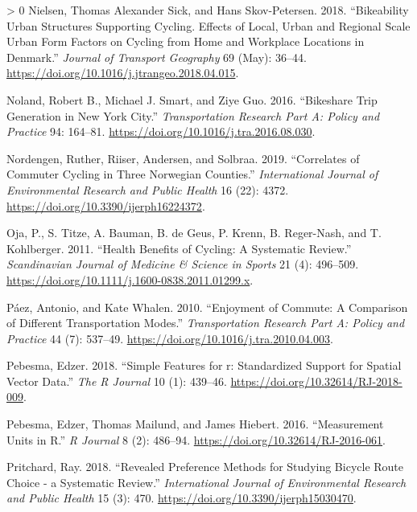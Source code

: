 \documentclass[smallextended]{svjour3}       %
\newlength{\cslhangindent}
\newenvironment{CSLReferences}[3] %
 {%
  \setlength{\parindent}{0pt}
  \ifodd #1 \everypar{\setlength{\hangindent}{\cslhangindent}}\ignorespaces\fi
  \ifnum #2 > 0
  \setlength{\parskip}{#2\baselineskip}
  \fi
 }%
 {}
\begin{document}
\begin{CSLReferences}{1}{0}
\leavevmode\hypertarget{ref-Nielsen2018}{}%
Nielsen, Thomas Alexander Sick, and Hans Skov-Petersen. 2018.
{``Bikeability {} {Urban} Structures Supporting Cycling. {Effects} of
Local, Urban and Regional Scale Urban Form Factors on Cycling from Home
and Workplace Locations in {Denmark}.''} \emph{Journal of Transport
Geography} 69 (May): 36--44.
\url{https://doi.org/10.1016/j.jtrangeo.2018.04.015}.

\leavevmode\hypertarget{ref-nolandBikeshareTripGeneration2016}{}%
Noland, Robert B., Michael J. Smart, and Ziye Guo. 2016. {``Bikeshare
Trip Generation in New York City.''} \emph{Transportation Research Part
A: Policy and Practice} 94: 164--81.
\url{https://doi.org/10.1016/j.tra.2016.08.030}.

\leavevmode\hypertarget{ref-Nordengen2019}{}%
Nordengen, Ruther, Riiser, Andersen, and Solbraa. 2019. {``Correlates of
{Commuter Cycling} in {Three Norwegian Counties}.''} \emph{International
Journal of Environmental Research and Public Health} 16 (22): 4372.
\url{https://doi.org/10.3390/ijerph16224372}.

\leavevmode\hypertarget{ref-Oja2011}{}%
Oja, P., S. Titze, A. Bauman, B. de Geus, P. Krenn, B. Reger-Nash, and
T. Kohlberger. 2011. {``Health Benefits of Cycling: A Systematic
Review.''} \emph{Scandinavian Journal of Medicine \& Science in Sports}
21 (4): 496--509.
\url{https://doi.org/10.1111/j.1600-0838.2011.01299.x}.

\leavevmode\hypertarget{ref-paezEnjoymentCommuteComparison2010}{}%
Páez, Antonio, and Kate Whalen. 2010. {``Enjoyment of Commute: {A}
Comparison of Different Transportation Modes.''} \emph{Transportation
Research Part A: Policy and Practice} 44 (7): 537--49.
\url{https://doi.org/10.1016/j.tra.2010.04.003}.

\leavevmode\hypertarget{ref-Pebesma2018}{}%
Pebesma, Edzer. 2018. {``Simple Features for r: {Standardized} Support
for Spatial Vector Data.''} \emph{The R Journal} 10 (1): 439--46.
\url{https://doi.org/10.32614/RJ-2018-009}.

\leavevmode\hypertarget{ref-Pebesma2016}{}%
Pebesma, Edzer, Thomas Mailund, and James Hiebert. 2016. {``Measurement
Units in {R}.''} \emph{R Journal} 8 (2): 486--94.
\url{https://doi.org/10.32614/RJ-2016-061}.

\leavevmode\hypertarget{ref-Pritchard2018}{}%
Pritchard, Ray. 2018. {``Revealed Preference Methods for Studying
Bicycle Route Choice - a Systematic Review.''} \emph{International
Journal of Environmental Research and Public Health} 15 (3): 470.
\url{https://doi.org/10.3390/ijerph15030470}.


\end{CSLReferences}
\end{document}
